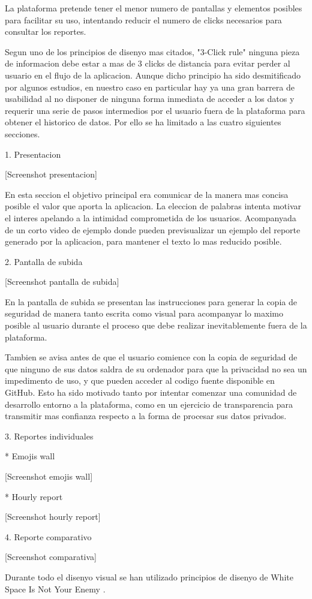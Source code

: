 
La plataforma pretende tener el menor numero de pantallas y elementos posibles para facilitar su uso, intentando reducir el numero de clicks necesarios para consultar los reportes.

Segun uno de los principios de disenyo mas citados, "3-Click rule"\cite{3ClickRule} ninguna pieza de informacion debe estar a mas de 3 clicks de distancia para evitar perder al usuario en el flujo de la aplicacion. Aunque dicho principio ha sido desmitificado por algunos estudios\cite{3ClickRuleMyth}, en nuestro caso en particular hay ya una gran barrera de usabilidad al no disponer de ninguna forma inmediata de acceder a los datos y requerir una serie de pasos intermedios por el usuario fuera de la plataforma para obtener el historico de datos. Por ello se ha limitado a las cuatro siguientes secciones.


1. Presentacion

[Screenshot presentacion]

En esta seccion el objetivo principal era comunicar de la manera mas concisa posible el valor que aporta la aplicacion. La eleccion de palabras intenta motivar el interes apelando a la intimidad comprometida de los usuarios. Acompanyada de un corto video de ejemplo donde pueden previsualizar un ejemplo del reporte generado por la aplicacion, para mantener el texto lo mas reducido posible.

2. Pantalla de subida

[Screenshot pantalla de subida]

En la pantalla de subida se presentan las instrucciones para generar la copia de seguridad de manera tanto escrita como visual para acompanyar lo maximo posible al usuario durante el proceso que debe realizar inevitablemente fuera de la plataforma.

Tambien se avisa antes de que el usuario comience con la copia de seguridad de que ninguno de sus datos saldra de su ordenador para que la privacidad no sea un impedimento de uso, y que pueden acceder al codigo fuente disponible en GitHub. Esto ha sido motivado tanto por intentar comenzar una comunidad de desarrollo entorno a la plataforma, como en un ejercicio de transparencia para transmitir mas confianza respecto a la forma de procesar sus datos privados.

3. Reportes individuales

* Emojis wall

[Screenshot emojis wall]

* Hourly report

[Screenshot hourly report]


4. Reporte comparativo

[Screenshot comparativa]

Durante todo el disenyo visual se han utilizado principios de disenyo de White Space Is Not Your Enemy \cite{WhiteSpace}.
